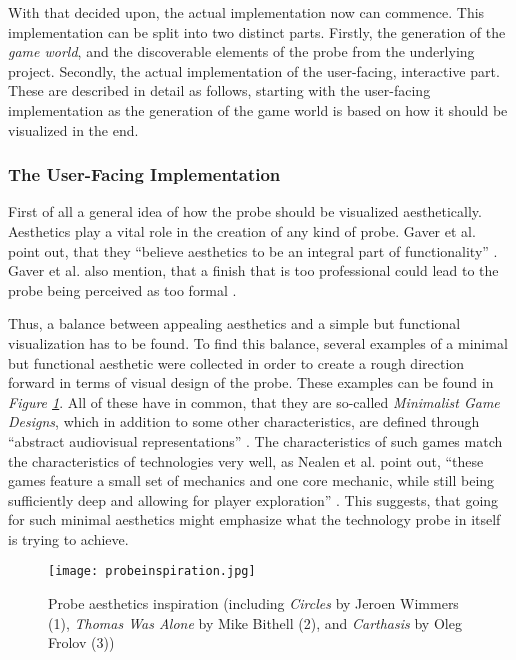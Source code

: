 With that decided upon, the actual implementation now can commence. This implementation can be split into two distinct parts. Firstly, the generation of the \textit{game world}, and the discoverable elements of the probe from the underlying project. Secondly, the actual implementation of the user-facing, interactive part. These are described in detail as follows, starting with the user-facing implementation as the generation of the game world is based on how it should be visualized in the end.

\subsubsection{The User-Facing Implementation}

First of all a general idea of how the probe should be visualized aesthetically. Aesthetics play a vital role in the creation of any kind of probe. Gaver et al. point out, that they \enquote{believe aesthetics to be an integral part of functionality} \cite[p. 25]{gaver1999design}. Gaver et al. also mention, that a finish that is too professional could lead to the probe being perceived as too formal \cite{gaver1999design}.

Thus, a balance between appealing aesthetics and a simple but functional visualization has to be found. To find this balance, several examples of a minimal but functional aesthetic were collected in order to create a rough direction forward in terms of visual design of the probe. These examples can be found in \textit{Figure \ref{fig:probeinspiration}}. All of these have in common, that they are so-called \textit{Minimalist Game Designs}, which in addition to some other characteristics, are defined through \enquote{abstract audiovisual representations} \cite[p. 38]{nealen2011towards}. The characteristics of such games match the characteristics of technologies very well, as Nealen et al. point out, \enquote{these games feature a small set of mechanics and one core mechanic, while still being sufficiently deep and allowing for player exploration} \cite[p. 38]{nealen2011towards}. This suggests, that going for such minimal aesthetics might emphasize what the technology probe in itself is trying to achieve.

\begin{figure}[h]
  \centering
  \texttt{[image: probeinspiration.jpg]}
  \caption{Probe aesthetics inspiration (including \textit{Circles} \cite{circles2017} by Jeroen Wimmers (1), \textit{Thomas Was Alone} \cite{thomas2015} by Mike Bithell (2), and \textit{Carthasis} \cite{dribble2021} by Oleg Frolov (3))}
  \label{fig:probeinspiration}
\end{figure}

